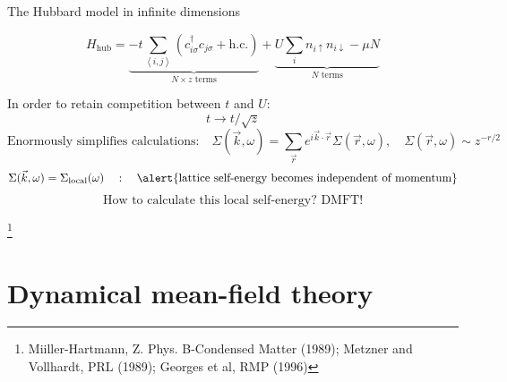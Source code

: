 \documentclass[11pt,aspectratio=169]{beamer}
\newcommand{\eqbox}[1]{
\centering
\begin{tcolorbox}[width=\textwidth,
                  boxsep=0pt,
                  left=0pt,
                  right=0pt,
                  top=5pt,
                  bottom=10pt,
                  arc=0pt,
                  boxrule=0pt,toprule=0pt,
                  colback=lightgray,
		  frame empty
                  ]%
\[{#1}\]
\end{tcolorbox}
}
\begin{document}
\begin{frame}{The Hubbard model in infinite dimensions}

\eqbox{
	H_\text{hub} = \underbrace{-t\sum_{\left<i,j\right>}\left(c^\dagger_{i\sigma}c_{j\sigma} + \text{h.c.}\right)}_{N\times z \text{ terms}} + \underbrace{U\sum_i n_{i \uparrow}n_{i \downarrow} - \mu N}_{N \text{ terms}}
}
	In order to retain competition between \(t\) and \(U\): 
	\[t \to t/\sqrt{z}\]
	\[\text{Enormously simplifies calculations:} \quad \Sigma(\vec k,\omega) = \sum_{\vec r}e^{i \vec{k}\cdot\vec{r}}\Sigma(\vec r, \omega), \quad \Sigma(\vec r, \omega) \sim z^{-r/2}\]
	\[\Sigma(\vec k,\omega) = \Sigma_\text{local}(\omega) \quad:\quad\text{\alert{lattice self-energy becomes independent of momentum}}\]
	\[\text{How to calculate this local self-energy? DMFT!}\]

	\footnote{Miiller-Hartmann, Z. Phys. B-Condensed Matter (1989); Metzner and Vollhardt, PRL (1989); Georges et al, RMP (1996)}
\end{frame}


\section{Dynamical mean-field theory}
\end{document}
